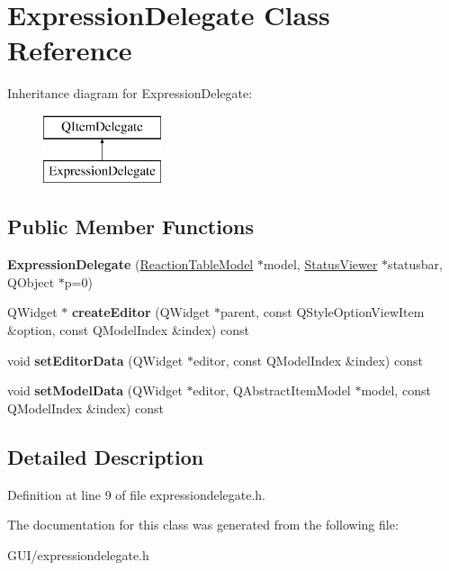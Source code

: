 \hypertarget{class_expression_delegate}{}\section{Expression\+Delegate Class Reference}
\label{class_expression_delegate}
Inheritance diagram for Expression\+Delegate\+:\begin{figure}[H]
\begin{center}
\leavevmode
\includegraphics[height=2.000000cm]{class_expression_delegate}
\end{center}
\end{figure}
\subsection*{Public Member Functions}
\begin{DoxyCompactItemize}
\item 
\mbox{\label{class_expression_delegate_a41d0ffe5aea0c055cfe1cccf41e76f76}} 
{\bfseries Expression\+Delegate} (\hyperlink{class_reaction_table_model}{Reaction\+Table\+Model} $\ast$model, \hyperlink{class_status_viewer}{Status\+Viewer} $\ast$statusbar, Q\+Object $\ast$p=0)
\item 
\mbox{\label{class_expression_delegate_ae0d3a0e936f054b8824ba63554ff0cc3}} 
Q\+Widget $\ast$ {\bfseries create\+Editor} (Q\+Widget $\ast$parent, const Q\+Style\+Option\+View\+Item \&option, const Q\+Model\+Index \&index) const
\item 
\mbox{\label{class_expression_delegate_aa829705ea2fdaa9772bc27e1afcd7afb}} 
void {\bfseries set\+Editor\+Data} (Q\+Widget $\ast$editor, const Q\+Model\+Index \&index) const
\item 
\mbox{\label{class_expression_delegate_add132f3267775b7261ccc77c34fe91f1}} 
void {\bfseries set\+Model\+Data} (Q\+Widget $\ast$editor, Q\+Abstract\+Item\+Model $\ast$model, const Q\+Model\+Index \&index) const
\end{DoxyCompactItemize}


\subsection{Detailed Description}


Definition at line 9 of file expressiondelegate.\+h.



The documentation for this class was generated from the following file\+:\begin{DoxyCompactItemize}
\item 
G\+U\+I/expressiondelegate.\+h\end{DoxyCompactItemize}
